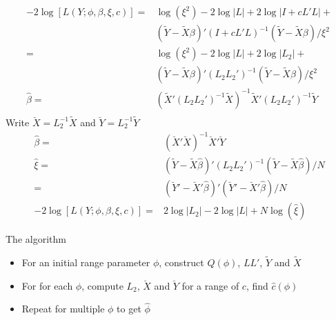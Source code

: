 \documentclass[12pt]{article}
\begin{document}
\begin{align*}
-2 \log[L(Y;\phi,\beta,\xi,c)] = &
\log(\xi^2) - 2 \log |L|  + 2 \log |I + cL'L| + \\
&(\tilde Y - \tilde X \beta)' ( I + cL'L )^{-1}
 (\tilde Y - \tilde X \beta)/\xi^2\\
= & \log(\xi^2) - 2 \log |L| + 2 \log |L_2| +  \\
&(\tilde Y - \tilde X \beta)' ( L_2 L_2' )^{-1}
 (\tilde Y - \tilde X
\beta)/\xi^2\\
\hat\beta = &(\tilde X' (L_2 L_2' )^{-1} \tilde X)^{-1} \tilde X'(L_2 L_2'
)^{-1} \tilde Y\\
\end{align*}
Write $\breve X = L_2^{-1} \tilde X$ and $\breve Y = L_2^{-1} \tilde Y$
\begin{align*}
\hat\beta = & (\breve X' \breve X)^{-1} \breve X' \breve Y\\
\hat\xi =&    (\tilde Y - \tilde X \hat \beta)' ( L_2 L_2' )^{-1}%
(\tilde Y - \tilde X \hat \beta)/N\\
 = & (\breve Y' - \breve X' \hat\beta)'%
  (\breve Y' - \breve X' \hat\beta) / N\\
  -2 \log[L(Y;\phi,\beta,\xi,c)] =  &  2 \log |L_2| - 2 \log |L| + N
  \log(\hat\xi)
\end{align*}


The algorithm
\begin{itemize}
  \item For an initial range parameter $\phi$, construct $Q(\phi)$, $LL'$,
  $\tilde Y$ and $\tilde X$
  \item For for each $\phi$, compute $L_2$, $\breve X$ and $\breve Y$ for a
  range of $c$, find $\hat c(\phi)$
  \item Repeat for multiple $\phi$ to get $\hat \phi$
\end{itemize}
\end{document}
